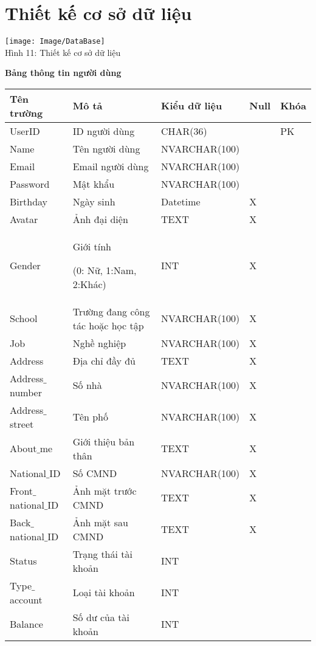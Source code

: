 \documentclass[12pt,a4paper]{report}
\begin{document}
\section{Thiết kế cơ sở dữ liệu}
\begin{center}
    \begin{center}
     \texttt{[image: Image/DataBase]}\\
     Hình 11: Thiết kế cơ sở dữ liệu
    \end{center}
\end{center}
\newpage
\textbf{Bảng thông tin người dùng}
\begin{center}
	\begin{tabular}{|>{\raggedright\arraybackslash}m{3.5cm}|>{\raggedright\arraybackslash}m{5cm}|>{\raggedright\arraybackslash}m{3.6cm}| >{\centering\arraybackslash}m{1cm}| >{\centering\arraybackslash}m{1cm}|}
\hline 
\textbf{Tên trường} & \textbf{Mô tả} & \textbf{Kiểu dữ liệu} & \textbf{Null} & \textbf{Khóa} \\ 
\hline 
UserID & ID người dùng & CHAR(36) &  & PK \\ 
\hline 
Name & Tên người dùng & NVARCHAR(100) &  &  \\ 
\hline 
Email & Email người dùng & NVARCHAR(100) &  &  \\ 
\hline 
Password & Mật khẩu & NVARCHAR(100) &  &  \\ 
\hline 
Birthday & Ngày sinh & Datetime & X &  \\ 
\hline 
Avatar & Ảnh đại diện & TEXT & X &  \\ 
\hline 
Gender & Giới tính 

		(0: Nữ, 1:Nam, 2:Khác) & INT & X &  \\ 
\hline 
School & Trường đang công tác hoặc học tập & NVARCHAR(100) & X &  \\ 
\hline 
Job & Nghề nghiệp & NVARCHAR(100) & X &  \\ 
\hline 
Address & Địa chỉ đầy đủ & TEXT & X &  \\ 
\hline 
Address$\_$number & Số nhà & NVARCHAR(100) & X &  \\ 
\hline 
Address$\_$street & Tên phố & NVARCHAR(100) & X &  \\ 
\hline 
About$\_$me & Giới thiệu bản thân & TEXT & X &  \\ 
\hline 
National$\_$ID & Số CMND & NVARCHAR(100) & X &  \\ 
\hline 
Front$\_$national$\_$ID &  Ảnh mặt trước CMND& TEXT & X &  \\ 
\hline 
Back$\_$national$\_$ID & Ảnh mặt sau CMND & TEXT & X &  \\ 
\hline 
Status & Trạng thái tài khoản & INT &  &  \\ 
\hline 
Type$\_$account & Loại tài khoản & INT &  &  \\ 
\hline 
Balance & Số dư của tài khoản & INT &  &  \\ 
\hline 
	\end{tabular} 
\end{center}
\end{document}

